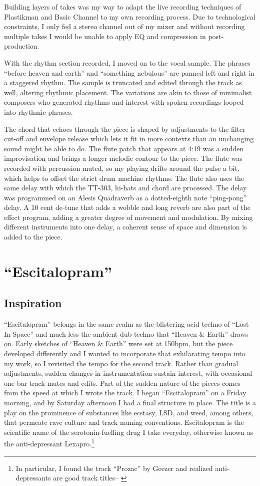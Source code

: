 \documentclass[12pt,twoside]{reedthesis}
\begin{document}
Building layers of takes was my way to adapt the live recording techniques of Plastikman and Basic Channel to my own recording process. Due to technological constraints, I only fed a stereo channel out of my mixer and without recording multiple takes I would be unable to apply EQ and compression in post-production.

With the rhythm section recorded, I moved on to the vocal sample. The phrases ``before heaven and earth'' and ``something nebulous'' are panned left and right in a staggered rhythm. The sample is truncated and edited through the track as well, altering rhythmic placement. The variations are akin to those of minimalist composers who generated rhythms and interest with spoken recordings looped into rhythmic phrases.

The chord that echoes through the piece is shaped by adjustments to the filter cut-off and envelope release which lets it fit in more contexts than an unchanging sound might be able to do. The flute patch that appears at 4:19 was a sudden improvisation and brings a longer melodic contour to the piece. The flute was recorded with percussion muted, so my playing drifts around the pulse a bit, which helps to offset the strict drum machine rhythms. The flute also uses the same delay with which the TT-303, hi-hats and chord are processed. The delay was programmed on an Alesis Quadraverb as a dotted-eighth note ``ping-pong'' delay. A 10 cent de-tune that adds a wobble and long reverb are also part of the effect program, adding a greater degree of movement and modulation. By mixing different instruments into one delay, a coherent sense of space and dimension is added to the piece.

\section{``Escitalopram''}

\subsection{Inspiration}

``Escitalopram'' belongs in the same realm as the blistering acid techno of ``Lost In Space'' and much less the ambient dub-techno that ``Heaven {\&} Earth'' draws on. Early sketches of ``Heaven {\&} Earth'' were set at 150bpm, but the piece developed differently and I wanted to incorporate that exhilarating tempo into my work, so I revisited the tempo for the second track. Rather than gradual adjustments, sudden changes in instrumentation sustain interest, with occasional one-bar track mutes and edits. Part of the sudden nature of the pieces comes from the speed at which I wrote the track. I began ``Escitalopram'' on a Friday morning, and by Saturday afternoon I had a final structure in place. The title is a play on the prominence of substances like ecstasy, LSD, and weed, among others, that permeate rave culture and track naming conventions. Escitalopram is the scientific name of the serotonin-fuelling drug I take everyday, otherwise known as the anti-depressant Lexapro.\footnote{In particular, I found the track ``Prozac'' by Geezer and realized anti-depressants are good track titles-- \cite{geezerProzac1996}}
\end{document}
